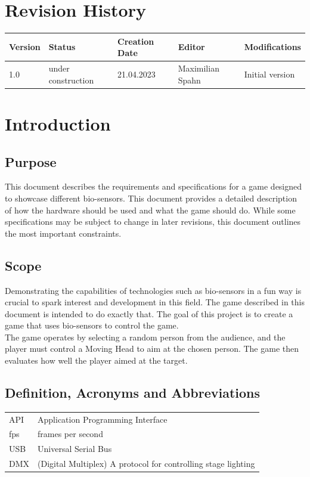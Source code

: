 \documentclass[a4paper]{scrreprt}
\begin{document}
\tableofcontents

\listoffigures

\chapter*{Revision History}

\begin{center}
    \begin{tabular}{|l|l|l|l|l|}
        \hline
		\bfseries{Version} & \bfseries{Status} & \bfseries{Creation Date} & \bfseries{Editor} & \bfseries{Modifications}\\
		\hline
		1.0 & under construction & 21.04.2023 & Maximilian Spahn & Initial version\\
        \hline
    \end{tabular}
\end{center}

\chapter{Introduction}

\section{Purpose}
This document describes the requirements and specifications for a game designed 
to showcase different bio-sensors. 
This document provides a detailed description of how the hardware 
should be used and what the game should do. 
While some specifications may be subject to change in later revisions, 
this document outlines the most important constraints.

\section{Scope}
Demonstrating the capabilities of technologies such as bio-sensors in a fun way is crucial 
to spark interest and development in this field. The game described in this document is 
intended to do exactly that. The goal of this project is to create a game that uses 
bio-sensors to control the game.\\

The game operates by selecting a random person from the audience, 
and the player must control a Moving Head to aim at the chosen person. 
The game then evaluates how well the player aimed at the target.

\section{Definition, Acronyms and Abbreviations}
\begin{longtable}{l l}
	API & Application Programming Interface\\
	fps & frames per second\\
	USB & Universal Serial Bus\\
	DMX & (Digital Multiplex) A protocol for controlling stage lighting\\
\end{longtable}
\end{document}
